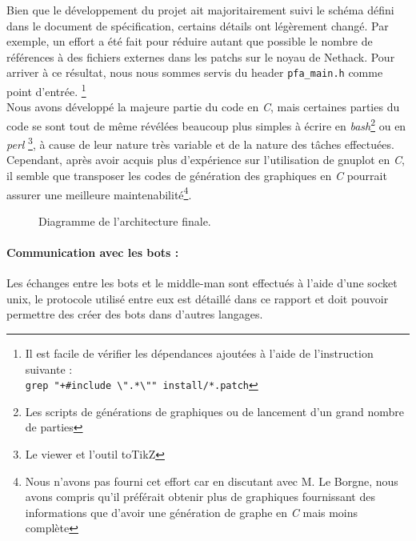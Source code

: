 \documentclass[a4paper,12pt]{article}
\begin{document}
Bien que le développement du projet ait majoritairement suivi le schéma
défini dans le document de spécification, certains détails ont légèrement
changé. Par exemple, un effort a été fait pour réduire autant que possible
le nombre de références à des fichiers externes dans les patchs sur le noyau
de Nethack. Pour arriver à ce résultat, nous nous sommes servis du header
{\verb|pfa_main.h|} comme point d'entrée.
\footnote{Il est facile de vérifier les dépendances ajoutées à l'aide de
  l'instruction suivante :\\
{\verb*|grep "+#include \".*\"" install/*.patch|}}
\\
Nous avons développé la majeure partie du code en {\em C}, mais certaines
parties du code se sont tout de même révélées beaucoup plus simples à
écrire en {\em bash}\footnote{Les scripts de générations de graphiques ou de
  lancement d'un grand nombre de parties} ou en {\em perl}
\footnote{Le viewer et l'outil toTikZ}, à cause de leur nature très variable
et de la nature des tâches effectuées. Cependant, après avoir acquis plus
d'expérience sur l'utilisation de gnuplot en {\em C}, il semble que transposer
les codes de génération des graphiques en {\em C} pourrait assurer une
meilleure maintenabilité\footnote{Nous n'avons pas fourni cet effort car en
discutant avec M. Le Borgne, nous avons compris qu'il préférait obtenir
plus de graphiques fournissant des informations que d'avoir une génération de
graphe en {\em C} mais moins complète}.

\begin{figure}[H]
	\caption{\label{fig:architecture} Diagramme de l'architecture finale.}
\end{figure}

\paragraph{Communication avec les bots :}
Les échanges entre les bots et le middle-man sont effectués à l'aide d'une
socket unix, le protocole utilisé entre eux est détaillé dans ce rapport et doit
pouvoir permettre des créer des bots dans d'autres langages.
\end{document}
